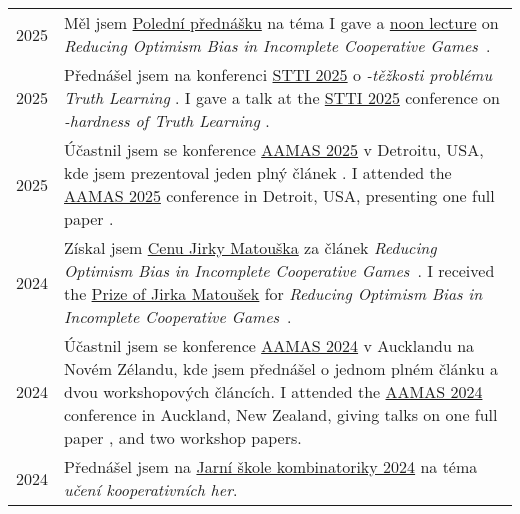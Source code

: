 \section{}

\begin{tabularx}{\linewidth}{>{\raggedleft\scshape}p{2cm}X}
	2025          & \lng
	{Měl jsem \href{https://www.mff.cuni.cz/en/kam/teaching-and-seminars/noon-lectures/2025/30102025}{Polední přednášku} na téma}
	{I gave a \href{https://www.mff.cuni.cz/en/kam/teaching-and-seminars/noon-lectures/2025/30102025}{noon lecture} on}
	 \emph{Reducing Optimism Bias in Incomplete Cooperative Games}~\cite{10.5555/3635637.3663047}.
	\\
	2025          & \lng
	{Přednášel jsem na konferenci \href{https://www.mff.cuni.cz/cs/iuuk/akce/konference/stti-2025}{STTI 2025} o \emph{\np-těžkosti problému Truth Learning} \cite{aamas25}.}
	{I gave a talk at the \href{https://www.mff.cuni.cz/cs/iuuk/akce/konference/stti-2025}{STTI 2025} conference on \emph{\np-hardness of Truth Learning} \cite{aamas25}.}
	\\
	2025          & \lng
	{Účastnil jsem se konference \href{https://www.aamas2025.org/}{AAMAS 2025} v Detroitu, USA, kde jsem prezentoval jeden plný článek \cite{aamas25}.}
	{I attended the \href{https://www.aamas2025.org/}{AAMAS 2025} conference in Detroit, USA, presenting one full paper \cite{aamas25}.}
	\\
	2024          & \lng
	{Získal jsem \href{https://www.mff.cuni.cz/cs/kam/vyzkum/cena-jirky-matouska}{Cenu Jirky Matouška} za článek  \emph{Reducing Optimism Bias in Incomplete Cooperative Games}~\cite{10.5555/3635637.3663047}.}
	{I received the \href{https://www.mff.cuni.cz/en/kam/research/prize-of-jirka-matousek}{Prize of Jirka Matoušek} for \emph{Reducing Optimism Bias in Incomplete Cooperative Games}~\cite{10.5555/3635637.3663047}.} \\
	2024          & \lng
	{Účastnil jsem se konference \href{https://www.aamas2024-conference.auckland.ac.nz/}{AAMAS 2024} v Aucklandu na Novém Zélandu, kde jsem přednášel o jednom plném článku \cite{10.5555/3635637.3663047} a dvou workshopových článcích.}
	{I attended the \href{https://www.aamas2024-conference.auckland.ac.nz/}{AAMAS 2024} conference in Auckland, New Zealand, giving talks on one full paper \cite{10.5555/3635637.3663047}, and two workshop papers.}
	\\
	2024          & \lng
	{Přednášel jsem na \href{https://kam.mff.cuni.cz/~spring/2024/}{Jarní škole kombinatoriky 2024} na téma \emph{učení kooperativních her}.}

\end{tabularx}

